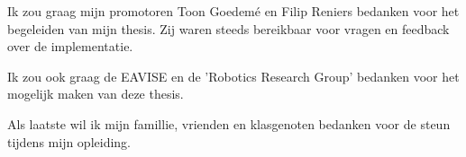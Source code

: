 Ik zou graag mijn promotoren Toon Goedem\'{e} en Filip Reniers bedanken voor het begeleiden van mijn thesis.
Zij waren steeds bereikbaar voor vragen en feedback over de implementatie.

Ik zou ook graag de EAVISE en de 'Robotics Research Group' bedanken voor het mogelijk maken van deze thesis.

Als laatste wil ik mijn famillie, vrienden en klasgenoten bedanken voor de steun tijdens mijn opleiding.